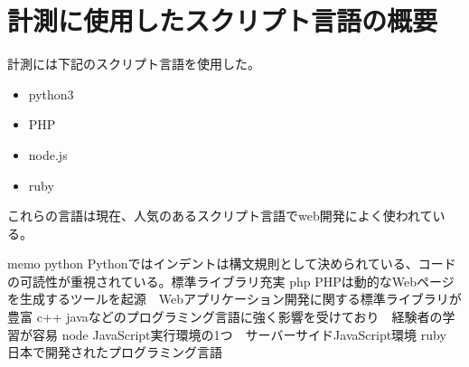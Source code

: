 \chapter{計測に使用したスクリプト言語の概要}
\label{cha:script-language}
計測には下記のスクリプト言語を使用した。
\begin{itemize}
  \item python3
  \item PHP
　\item node.js
  \item ruby
\end{itemize}
これらの言語は現在、人気のあるスクリプト言語でweb開発によく使われている。

memo
python
Pythonではインデントは構文規則として決められている、コードの可読性が重視されている。標準ライブラリ充実
php
PHPは動的なWebページを生成するツールを起源　Webアプリケーション開発に関する標準ライブラリが豊富
c++ javaなどのプログラミング言語に強く影響を受けており　経験者の学習が容易
node
JavaScript実行環境の1つ　サーバーサイドJavaScript環境
ruby
日本で開発されたプログラミング言語